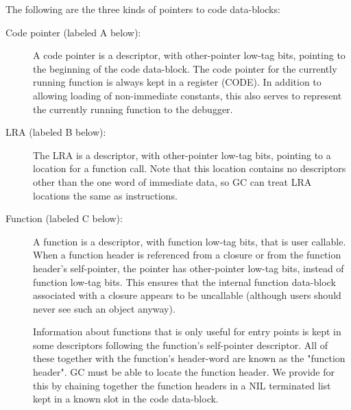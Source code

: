 The following are the three kinds of pointers to code data-blocks:
\begin{description}
   \item[Code pointer (labeled A below):]
      A code pointer is a descriptor, with other-pointer low-tag bits, pointing
      to the beginning of the code data-block.  The code pointer for the
      currently running function is always kept in a register (CODE).  In
      addition to allowing loading of non-immediate constants, this also serves
      to represent the currently running function to the debugger.
   \item[LRA (labeled B below):]
      The LRA is a descriptor, with other-pointer low-tag bits, pointing
      to a location for a function call.  Note that this location contains no
      descriptors other than the one word of immediate data, so GC can treat
      LRA locations the same as instructions.
   \item[Function (labeled C below):]
      A function is a descriptor, with function low-tag bits, that is user
      callable.  When a function header is referenced from a closure or from
      the function header's self-pointer, the pointer has other-pointer low-tag
      bits, instead of function low-tag bits.  This ensures that the internal
      function data-block associated with a closure appears to be uncallable
      (although users should never see such an object anyway).

      Information about functions that is only useful for entry points is kept
      in some descriptors following the function's self-pointer descriptor.
      All of these together with the function's header-word are known as the
      "function header".  GC must be able to locate the function header.  We
      provide for this by chaining together the function headers in a NIL
      terminated list kept in a known slot in the code data-block.
\end{description}

